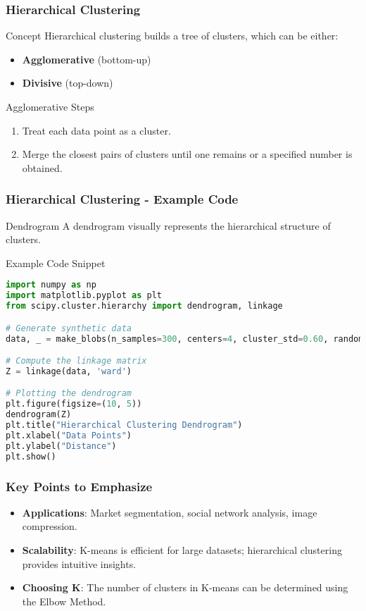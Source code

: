 \documentclass[aspectratio=169]{beamer}
\begin{document}
\begin{frame}[fragile]
    \frametitle{Hierarchical Clustering}
    \begin{block}{Concept}
        Hierarchical clustering builds a tree of clusters, which can be either:
        \begin{itemize}
            \item \textbf{Agglomerative} (bottom-up)
            \item \textbf{Divisive} (top-down)
        \end{itemize}
    \end{block}

    \begin{block}{Agglomerative Steps}
        \begin{enumerate}
            \item Treat each data point as a cluster.
            \item Merge the closest pairs of clusters until one remains or a specified number is obtained.
        \end{enumerate}
    \end{block}
\end{frame}

\begin{frame}[fragile]
    \frametitle{Hierarchical Clustering - Example Code}
    \begin{block}{Dendrogram}
        A dendrogram visually represents the hierarchical structure of clusters.
    \end{block}
    
    \begin{block}{Example Code Snippet}
    \begin{lstlisting}[language=Python]
import numpy as np
import matplotlib.pyplot as plt
from scipy.cluster.hierarchy import dendrogram, linkage

# Generate synthetic data
data, _ = make_blobs(n_samples=300, centers=4, cluster_std=0.60, random_state=0)

# Compute the linkage matrix
Z = linkage(data, 'ward')

# Plotting the dendrogram
plt.figure(figsize=(10, 5))
dendrogram(Z)
plt.title("Hierarchical Clustering Dendrogram")
plt.xlabel("Data Points")
plt.ylabel("Distance")
plt.show()
    \end{lstlisting}
    \end{block}
\end{frame}

\begin{frame}
    \frametitle{Key Points to Emphasize}
    \begin{itemize}
        \item \textbf{Applications}: Market segmentation, social network analysis, image compression.
        \item \textbf{Scalability}: K-means is efficient for large datasets; hierarchical clustering provides intuitive insights.
        \item \textbf{Choosing K}: The number of clusters in K-means can be determined using the Elbow Method.
    \end{itemize}
\end{frame}
\end{document}
